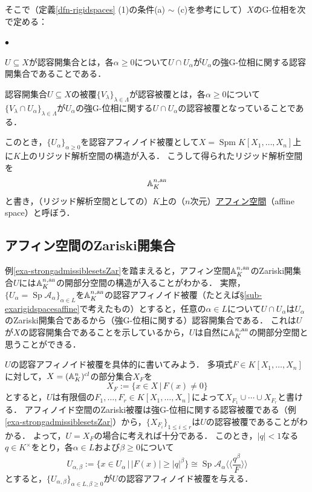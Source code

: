 \documentclass[a4paper,12pt, dvipdfmx]{jsbook}
\def\A{\mathbb{A}}
\def\cl{\mathop{\textsl{cl}}\nolimits}
\def\Spm{\mathop{\mathrm{Spm}}\nolimits}
\def\Sp{\mathop{\mathrm{Sp}}\nolimits}
\def\an{\textsl{an}}
\def\dl{\langle\!\langle}
\def\dr{\rangle\!\rangle}
\newcommand{\abs}[1]{\lvert#1\rvert}
\renewenvironment{itemize}%
{%
   \begin{list}{\parbox{1zw}{$\bullet$}}%
   {%
      \setlength{\topsep}{.5zh}
      \setlength{\itemindent}{0zw}
      \setlength{\leftmargin}{3zw}%
      \setlength{\rightmargin}{0zw}%
      \setlength{\labelsep}{.5zw}%
      \setlength{\labelwidth}{3zw}%
      \setlength{\itemsep}{0.2em}%
      \setlength{\parsep}{0em}%
      \setlength{\listparindent}{0zw}%
   }
}{%
   \end{list}%
}
\theoremstyle{plain}
\theoremstyle{definition}
\begin{document}
そこで（定義\ref{dfn-rigidspaces} (1)の条件(a) $\sim$ (c)を参考にして）$X$のG-位相を次で定める：
\begin{itemize}
\item $U\subseteq X$が認容開集合とは，各$\alpha\geq 0$について$U\cap U_{\alpha}$が$U_{\alpha}$の強G-位相に関する認容開集合であることである．
\item 認容開集合$U\subseteq X$の被覆$\{V_{\lambda}\}_{\lambda\in\Lambda}$が認容被覆とは，各$\alpha\geq 0$について$\{V_{\lambda}\cap U_{\alpha}\}_{\lambda\in\Lambda}$が$U_{\alpha}$の強G-位相に関する$U\cap U_{\alpha}$の認容被覆となっていることである．
\end{itemize}
このとき，$\{U_{\alpha}\}_{\alpha\geq 0}$を認容アフィノイド被覆として$X=\Spm K[X_1,\ldots,X_n]$上に$K$上のリジッド解析空間の構造が入る．
こうして得られたリジッド解析空間を
$$
\A^{n,\an}_K
$$
と書き，（リジッド解析空間としての）$K$上の（$n$次元）\underline{アフィン空間}（affine space）と呼ぼう．

\subsection{アフィン空間のZariski開集合}\label{sub-exaaffinespaceZariskiopen}
例\ref{exa-strongadmissiblesetsZar}を踏まえると，アフィン空間$\A^{n,\an}_K$のZariski開集合$U$には$\A^{n,\an}_K$の開部分空間の構造が入ることがわかる．
実際，$\{U_{\alpha}=\Sp\mathcal{A}_{\alpha}\}_{\alpha\in L}$を$\A^{n,\an}_K$の認容アフィノイド被覆（たとえば\S\ref{sub-exarigidspacesaffine}で考えたもの）とすると，任意の$\alpha\in L$について$U\cap U_{\alpha}$は$U_{\alpha}$のZariski開集合であるから（強G-位相に関する）認容開集合である．
これは$U$が$X$の認容開集合であることを示しているから，$U$は自然に$\A^{n,\an}_K$の開部分空間と思うことができる．

$U$の認容アフィノイド被覆を具体的に書いてみよう．
多項式$F\in K[X_1,\ldots,X_n]$に対して，$X=(\A^n_K)^{\cl}$の部分集合$X_F$を
$$
X_F:=\{x\in X\,|\,F(x)\neq 0\}
$$
とすると，$U$は有限個の$F_1,\ldots,F_r\in K[X_1,\ldots,X_n]$によって$X_{F_1}\cup\cdots\cup X_{F_r}$と書ける．
アフィノイド空間のZariski被覆は強G-位相に関する認容被覆である（例\ref{exa-strongadmissiblesetsZar}）から，$\{X_{F_i}\}_{1\leq  i\leq r}$は$U$の認容被覆であることがわかる．
よって，$U=X_F$の場合に考えれば十分である．
このとき，$\abs{q}<1$なる$q\in K^{\times}$をとり，各$\alpha\in L$および$\beta\geq 0$について
$$
U_{\alpha,\beta}:=\{x\in U_{\alpha}\,|\,\abs{F(x)}\geq\abs{q}^{\beta}\}\cong\Sp\mathcal{A}_{\alpha}\dl {\textstyle \frac{q^{\beta}}{F}}\dr
$$
とすると，$\{U_{\alpha,\beta}\}_{\alpha\in L,\beta\geq 0}$が$U$の認容アフィノイド被覆を与える．
\end{document}
